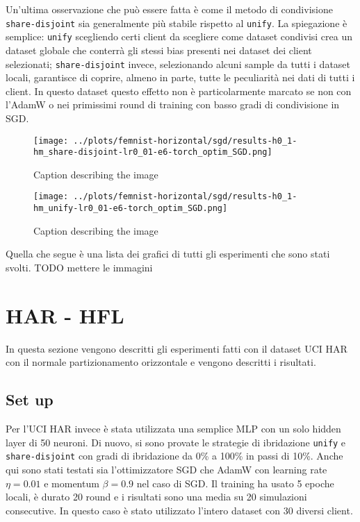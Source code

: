 Un'ultima osservazione che può essere fatta è come il metodo di condivisione
\texttt{share-disjoint} sia generalmente più stabile rispetto al 
\texttt{unify}. La spiegazione è semplice: \texttt{unify} scegliendo 
certi client da scegliere come dataset condivisi crea un dataset 
globale che conterrà gli stessi bias presenti nei dataset dei client 
selezionati; \texttt{share-disjoint} invece, selezionando alcuni sample 
da tutti i dataset locali, garantisce di coprire, almeno in parte, 
tutte le peculiarità nei dati di tutti i client. In questo dataset 
questo effetto non è particolarmente marcato se non con l'AdamW o nei 
primissimi round di training con basso gradi di condivisione in SGD.
\begin{figure}[htbp]  %
    \centering
    \texttt{[image: ../plots/femnist-horizontal/sgd/results-h0\_1-hm\_share-disjoint-lr0\_01-e6-torch\_optim\_SGD.png]}  %
    \caption{Caption describing the image}
    \label{fig:femnists2sgd}
\end{figure}
\begin{figure}[htbp]  %
    \centering
    \texttt{[image: ../plots/femnist-horizontal/sgd/results-h0\_1-hm\_unify-lr0\_01-e6-torch\_optim\_SGD.png]}  %
    \caption{Caption describing the image}
    \label{fig:femnists2sgd}
\end{figure}

Quella che segue è una lista dei grafici di tutti gli esperimenti
che sono stati svolti.
TODO mettere le immagini

\section{HAR - HFL}
In questa sezione vengono descritti gli esperimenti fatti con il dataset
UCI HAR con il normale partizionamento orizzontale e vengono descritti 
i risultati.

\subsection{Set up}
Per l'UCI HAR invece è stata utilizzata una semplice MLP con un solo 
hidden layer di 50 neuroni. Di nuovo, si sono provate le 
strategie di ibridazione \texttt{unify} e \texttt{share-disjoint} con 
gradi di ibridazione da 0\% a 100\% in passi di 10\%. Anche qui sono 
stati testati sia l'ottimizzatore SGD che AdamW con learning rate 
\(\eta = 0.01\) e momentum \(\beta = 0.9\) nel caso di SGD. Il 
training ha usato 5 epoche locali, è durato 20 round e i risultati 
sono una media su 20 simulazioni consecutive. In questo caso è stato 
utilizzato l'intero dataset con 30 diversi client.

